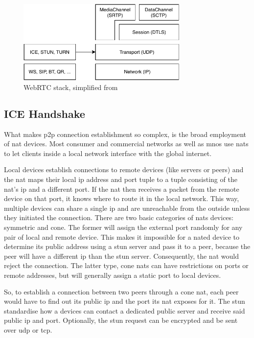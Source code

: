 \begin{figure}
\centering
\includegraphics[width=0.75\textwidth]{graphics/webrtc-proto.pdf}
\caption{WebRTC stack, simplified from \citet[p. 316, fig. 18.3]{high-performance-browser-networking}}
\label{fig:webrtc-proto}
\end{figure}

\subsection{ICE Handshake}
What makes \gls{p2p} connection establishment so complex, is the broad employment of \gls{nat} devices. Most consumer and commercial networks as well as \glspl{mno} use \glspl{nat} to let clients inside a local network interface with the global internet.

Local devices establish connections to remote devices (like servers or peers) and the \gls{nat} maps their local \gls{ip} address and port tuple to a tuple consisting of the \gls{nat}'s \gls{ip} and a different port. If the \gls{nat} then receives a packet from the remote device on that port, it knows where to route it in the local network. This way, multiple devices can share a single \gls{ip} and are unreachable from the outside unless they initiated the connection. There are two basic categories of \glspl{nat} devices: symmetric and cone. The former will assign the external port randomly for any pair of local and remote device. This makes it impossible for a \gls{nat}ed device to determine its public address using a stun server and pass it to a peer, because the peer will have a different \gls{ip} than the stun server. Consequently, the \gls{nat} would reject the connection. The latter type, cone \glspl{nat} can have restrictions on ports or remote addresses, but will generally assign a static port to local devices.

So, to establish a connection between two peers through a cone \gls{nat}, each peer would have to find out its public \gls{ip} and the port its \gls{nat} exposes for it. The \gls{stun} standardise how a devices can contact a dedicated public server and receive said public \gls{ip} and port. Optionally, the \gls{stun} request can be encrypted and be sent over \gls{udp} or \gls{tcp}.


